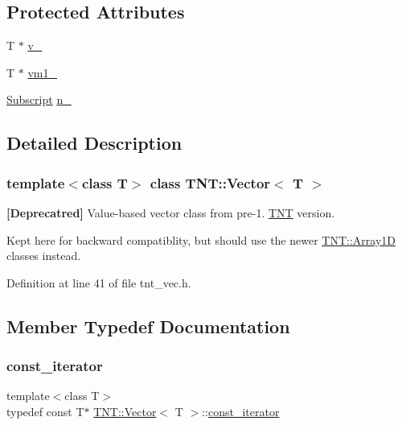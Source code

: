 \subsection*{Protected Attributes}
\begin{DoxyCompactItemize}
\item 
T $\ast$ \hyperlink{classTNT_1_1Vector_a67b413bf6956350ff9dda9faee707433}{v\+\_\+}
\item 
T $\ast$ \hyperlink{classTNT_1_1Vector_a55f5ebf43f5af53aabdfae15a1ce11d4}{vm1\+\_\+}
\item 
\hyperlink{namespaceTNT_af22e3f1460e145c04ce4e7d701e4c1c1}{Subscript} \hyperlink{classTNT_1_1Vector_accfd20cf0105ad3c153aeebf728f5bbc}{n\+\_\+}
\end{DoxyCompactItemize}


\subsection{Detailed Description}
\subsubsection*{template$<$class T$>$\newline
class T\+N\+T\+::\+Vector$<$ T $>$}

{\bfseries \mbox{[}Deprecatred\mbox{]}} Value-\/based vector class from pre-\/1. \hyperlink{namespaceTNT}{T\+NT} version. 

Kept here for backward compatiblity, but should use the newer \hyperlink{classTNT_1_1Array1D}{T\+N\+T\+::\+Array1D} classes instead. 

Definition at line 41 of file tnt\+\_\+vec.\+h.



\subsection{Member Typedef Documentation}
\mbox{\label{classTNT_1_1Vector_a9a825ae9b3cb568a7b02449da6e9779f}} 
\subsubsection{\texorpdfstring{const\+\_\+iterator}{const\_iterator}}
{\footnotesize\ttfamily template$<$class T$>$ \\
typedef const T$\ast$ \hyperlink{classTNT_1_1Vector}{T\+N\+T\+::\+Vector}$<$ T $>$\+::\hyperlink{classTNT_1_1Vector_a9a825ae9b3cb568a7b02449da6e9779f}{const\+\_\+iterator}}



